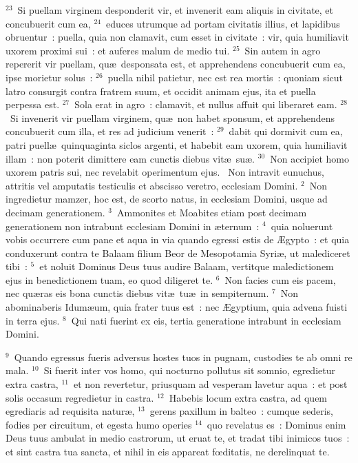 ${}^{23}$~Si puellam virginem desponderit vir, et invenerit eam aliquis in civitate, et concubuerit cum ea,
${}^{24}$~educes utrumque ad portam civitatis illius, et lapidibus obruentur~: puella, quia non clamavit, cum esset in civitate~: vir, quia humiliavit uxorem proximi sui~: et auferes malum de medio tui.
${}^{25}$~Sin autem in agro repererit vir puellam, qu\ae\ desponsata est, et apprehendens concubuerit cum ea, ipse morietur solus~:
${}^{26}$~puella nihil patietur, nec est rea mortis~: quoniam sicut latro consurgit contra fratrem suum, et occidit animam ejus, ita et puella perpessa est.
${}^{27}$~Sola erat in agro~: clamavit, et nullus affuit qui liberaret eam.
${}^{28}$~Si invenerit vir puellam virginem, qu\ae\ non habet sponsum, et apprehendens concubuerit cum illa, et res ad judicium venerit~:
${}^{29}$~dabit qui dormivit cum ea, patri puell\ae\ quinquaginta siclos argenti, et habebit eam uxorem, quia humiliavit illam~: non poterit dimittere eam cunctis diebus vit\ae\ su\ae .
${}^{30}$~Non accipiet homo uxorem patris sui, nec revelabit operimentum ejus.
~Non intravit eunuchus, attritis vel amputatis testiculis et abscisso veretro, ecclesiam Domini.
${}^{2}$~Non ingredietur mamzer, hoc est, de scorto natus, in ecclesiam Domini, usque ad decimam generationem.
${}^{3}$~Ammonites et Moabites etiam post decimam generationem non intrabunt ecclesiam Domini in \ae ternum~:
${}^{4}$~quia noluerunt vobis occurrere cum pane et aqua in via quando egressi estis de \AE gypto~: et quia conduxerunt contra te Balaam filium Beor de Mesopotamia Syri\ae , ut malediceret tibi~:
${}^{5}$~et noluit Dominus Deus tuus audire Balaam, vertitque maledictionem ejus in benedictionem tuam, eo quod diligeret te.
${}^{6}$~Non facies cum eis pacem, nec qu\ae ras eis bona cunctis diebus vit\ae\ tu\ae\ in sempiternum.
${}^{7}$~Non abominaberis Idum\ae um, quia frater tuus est~: nec \AE gyptium, quia advena fuisti in terra ejus.
${}^{8}$~Qui nati fuerint ex eis, tertia generatione intrabunt in ecclesiam Domini.


${}^{9}$~Quando egressus fueris adversus hostes tuos in pugnam, custodies te ab omni re mala.
${}^{10}$~Si fuerit inter vos homo, qui nocturno pollutus sit somnio, egredietur extra castra,
${}^{11}$~et non revertetur, priusquam ad vesperam lavetur aqua~: et post solis occasum regredietur in castra.
${}^{12}$~Habebis locum extra castra, ad quem egrediaris ad requisita natur\ae ,
${}^{13}$~gerens paxillum in balteo~: cumque sederis, fodies per circuitum, et egesta humo operies
${}^{14}$~quo revelatus es~: Dominus enim Deus tuus ambulat in medio castrorum, ut eruat te, et tradat tibi inimicos tuos~: et sint castra tua sancta, et nihil in eis appareat fœditatis, ne derelinquat te.


